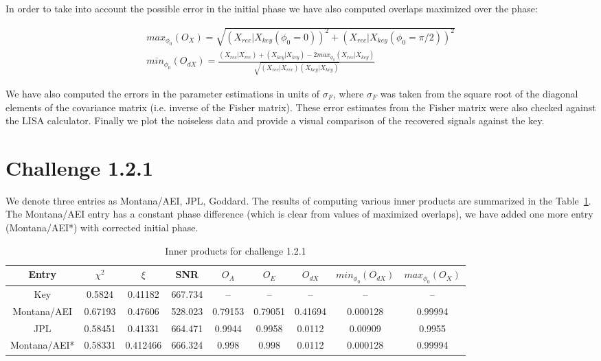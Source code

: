 \documentclass[prd,aps,amsfonts,amsmath, nofootinbib]{revtex4}
\def\bea{\begin{eqnarray}}
\def\ena{\end{eqnarray}}
\begin{document}
In order to take into account the possible error in the initial 
phase we have also computed overlaps maximized over the phase:

\bea
max_{\phi_0}(O_X) = \sqrt{(X_{rec}|X_{key}(\phi_0 = 0))^2 +
(X_{rec}|X_{key}(\phi_0 = \pi/2))^2}\\
min_{\phi_0}(O_{dX}) = \frac{ (X_{rec}|X_{rec}) + (X_{key}|X_{key}) -
2 max_{\phi_0}(X_{rec}|X_{key})}{\sqrt{(X_{rec}|X_{rec})(X_{key}|X_{key})}}
\ena

We have also computed the errors in the parameter estimations in units 
of $\sigma_{F}$, where $\sigma_{F}$ was taken from the square root of the diagonal elements of the covariance matrix (i.e. inverse of the Fisher matrix). These error estimates from the Fisher matrix were also checked against the LISA calculator.  Finally we plot the noiseless data and provide a visual comparison of the recovered signals against the key.

\section{Challenge 1.2.1}

We denote three entries as Montana/AEI, JPL, Goddard.
The results of computing various inner products are summarized in the 
Table~\ref{OlapsTable1.2.1}. The Montana/AEI entry has a constant phase difference (which is clear from values of
maximized overlaps), we have added one more entry (Montana/AEI*) with corrected initial phase.

\begin{table}
\caption{\label{OlapsTable1.2.1} Inner products for challenge 1.2.1}
\begin{ruledtabular}
\begin{tabular}{|c|c|c|c|c|c|c|c|c|}
Entry & $\chi^2$ & $\xi$ & SNR & $O_A$ & $O_E$ & $O_{dX}$ & $min_{\phi_0}(O_{dX})$ & $max_{\phi_0}(O_X)$\\
\hline
Key & 0.5824 & 0.41182 & 667.734 &  -- & -- & -- & -- & -- \\
Montana/AEI & 0.67193 & 0.47606 & 528.023 & 0.79153 & 0.79051 &
0.41694 & 0.000128 & 0.99994\\
JPL & 0.58451 & 0.41331 & 664.471 & 0.9944 & 0.9958 & 0.0112 &  0.00909 & 0.9955\\
Montana/AEI* & 0.58331 & 0.412466 & 666.324 & 0.998 & 0.998 & 0.0112 & 0.000128 & 0.99994 \\
\hline
\end{tabular}
\end{ruledtabular}
\end{table}
\end{document}
